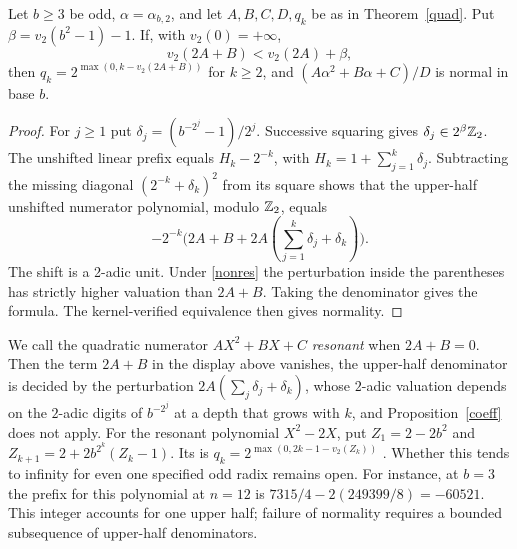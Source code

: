 \documentclass[11pt]{article}
\begin{document}
\begin{proposition}\label{coeff}
Let \(b\ge3\) be odd, \(\alpha=\alpha_{b,2}\), and let \(A,B,C,D,q_k\)
be as in Theorem~\ref{quad}. Put \(\beta=v_2(b^2-1)-1\).
If, with \(v_2(0)=+\infty\),
\begin{equation}\label{nonres}
 v_2(2A+B)<v_2(2A)+\beta ,
\end{equation}
then \(q_k=2^{\max(0,k-v_2(2A+B))}\) for \(k\ge2\), and
\((A\alpha^2+B\alpha+C)/D\) is normal in base \(b\).
\end{proposition}
\begin{proof}
For \(j\ge1\) put \(\delta_j=(b^{-2^j}-1)/2^j\).
Successive squaring gives \(\delta_j\in2^\beta\mathbb Z_2\).
The unshifted linear prefix equals \(H_k-2^{-k}\), with
\(H_k=1+\sum_{j=1}^k\delta_j\). Subtracting the missing diagonal
\((2^{-k}+\delta_k)^2\) from its square shows that the upper-half
unshifted numerator polynomial, modulo \(\mathbb Z_2\), equals
\[
 -2^{-k}\bigl(2A+B+2A(\textstyle\sum_{j=1}^k\delta_j+\delta_k)\bigr).
\]
The shift is a 2-adic unit. Under \eqref{nonres} the perturbation inside
the parentheses has strictly higher valuation than \(2A+B\).
Taking the denominator gives the formula. The kernel-verified equivalence
then gives normality.
\end{proof}
We call the quadratic numerator \(AX^2+BX+C\) \emph{resonant} when
\(2A+B=0\). Then the term \(2A+B\) in the display above vanishes, the
upper-half denominator is decided by the perturbation
\(2A(\sum_j\delta_j+\delta_k)\), whose \(2\)-adic valuation depends on the
\(2\)-adic digits of \(b^{-2^j}\) at a depth that grows with \(k\), and
Proposition~\ref{coeff} does not apply.
For the resonant polynomial \(X^2-2X\), put \(Z_1=2-2b^2\) and
\(Z_{k+1}=2+2b^{2^k}(Z_k-1)\). Its
 is
\(q_k=2^{\max(0,2k-1-v_2(Z_k))}\) .
Whether this tends to infinity for even one specified odd radix remains
open. For instance, at \(b=3\) the prefix for this polynomial at
\(n=12\) is \(7315/4-2(249399/8)=-60521\). This integer accounts for
one upper half; failure of normality requires a bounded subsequence of
upper-half denominators.
\end{document}
